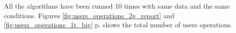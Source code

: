 All the algorithms have been runned 10 times with same data and the same conditions. Figures \ref{fig:users_operations_2g_report} and \ref{fig:users_operations_1t_big} p.\pageref{fig:users_operations_2g_report} shows the total number of users operations.



